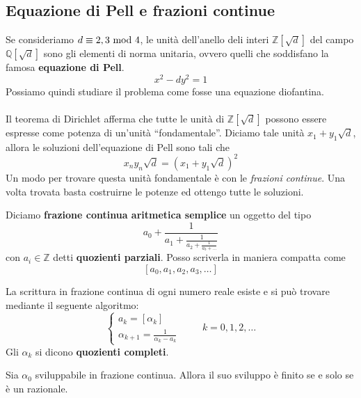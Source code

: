 \subsection{Equazione di Pell e frazioni continue}
Se consideriamo $d\equiv2,3\ \mathrm{mod}\ 4$, le unità dell'anello deli interi $\mathbb{Z}[\sqrt{d}]$ del campo $\mathbb{Q}[\sqrt{d}]$ sono gli elementi di norma unitaria, ovvero quelli che soddisfano la famosa \textbf{equazione di Pell}.
\begin{equation*}
x^2-dy^2=1
\end{equation*}
Possiamo quindi studiare il problema come fosse una equazione diofantina. \\ \\ Il teorema di Dirichlet afferma che tutte le unità di $\mathbb{Z}[\sqrt{d}]$ possono essere espresse come potenza di un'unità \enquote{fondamentale}. Diciamo tale unità $x_1+y_1\sqrt{d}$, allora le soluzioni dell'equazione di Pell sono tali che 
\begin{equation*}
x_ny_n\sqrt{d}=\left(x_1+y_1\sqrt{d}\right)^2
\end{equation*}
Un modo per trovare questa unità fondamentale è con le \textit{frazioni continue}. Una volta trovata basta costruirne le potenze ed ottengo tutte le soluzioni.
\begin{definizione}
	Diciamo \textbf{frazione continua aritmetica semplice} un oggetto del tipo
	\begin{equation*}
	a_0+\frac{1}{a_1+\frac{1}{a_2+\frac{1}{a_3+\dots}}}
	\end{equation*}
	con $a_i\in\mathbb{Z}$ detti \textbf{quozienti parziali}. Posso scriverla in maniera compatta come 
	\begin{equation*}
	\left[a_0,a_1,a_2,a_3,\dots\right]
	\end{equation*}
\end{definizione}
\begin{proposizione}
	La scrittura in frazione continua di ogni numero reale esiste e si può trovare mediante il seguente algoritmo:
	\begin{equation*}
	\begin{cases}
	a_k=\left[\alpha_k\right]\\
	\alpha_{k+1}=\frac{1}{\alpha_k-a_k}
	\end{cases}
	\ \ \ \ \ \ \ \ \ \ k=0,1,2,\dots
	\end{equation*}
	Gli $\alpha_k$ si dicono \textbf{quozienti completi}. 
\end{proposizione}
\begin{proposizione}
	Sia $\alpha_0$ sviluppabile in frazione continua. Allora il suo sviluppo è finito se e solo se è un razionale.
\end{proposizione}
